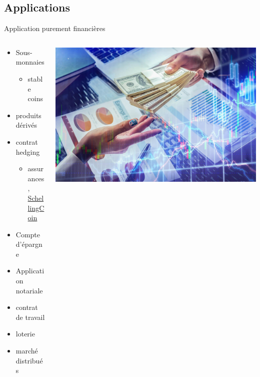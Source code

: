 \documentclass[presentation]{beamer}
\begin{document}
\subsection{Applications}
\label{sec:org5f8c251}
\begin{frame}[label={sec:orgef83b21}]{Application purement financières}
\begin{columns}
\begin{column}{0.5\columnwidth}
\begin{block}{}
\begin{itemize}
\item Sous-monnaies
\begin{itemize}
\item stable coins
\end{itemize}
\item produits dérivés
\item contrat hedging
\begin{itemize}
\item assurances, \href{https://blog.ethereum.org/2014/03/28/schellingcoin-a-minimal-trust-universal-data-feed}{SchellingCoin}
\end{itemize}
\item Compte d'épargne
\item Application notariale
\item contrat de travail
\item loterie
\item marché distribués
\end{itemize}
\end{block}
\end{column}
\begin{column}{0.35\columnwidth}
\begin{block}{}
\begin{center}
\includegraphics[width=\textwidth]{Images/defi_service.jpeg}
\end{center}
\end{block}
\end{column}
\end{columns}
\end{frame}
\end{document}
